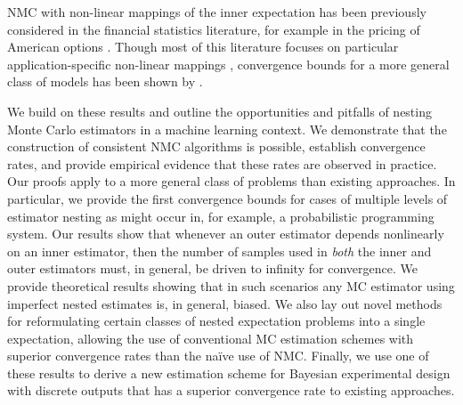 NMC with non-linear mappings of the inner expectation has been previously considered in
the financial statistics literature, for example in the pricing of American
options \citep{longstaff2001valuing}. Though most of this literature focuses on
particular application-specific non-linear mappings \citep{broadie2011efficient,gordy2010nested},
convergence bounds for a more general class of models
has been shown by \citet{hong2009estimating}.

We build on these results and outline the opportunities and pitfalls of nesting Monte Carlo
estimators in a machine learning context.
We demonstrate that the construction of consistent NMC algorithms is possible,
establish convergence rates, and provide
empirical evidence that these rates are observed in practice.
Our proofs apply to a more general class of problems than existing approaches.
In particular, we provide the first convergence bounds for cases of multiple levels of estimator nesting
as might occur in, for example, a probabilistic programming system.
Our results show that whenever an outer estimator depends nonlinearly on an inner
estimator, then the number of samples used in \emph{both} the inner and outer estimators
must, in general, be driven to infinity for convergence.  
We provide theoretical results showing that in such scenarios any MC
estimator using imperfect nested estimates is, in general, biased.
We also lay out novel methods for reformulating certain classes of nested expectation problems
into a single expectation, allowing the use of conventional MC estimation 
schemes with superior convergence rates than the na\"{i}ve use of NMC.  Finally, we use one of these results 
to derive a new estimation scheme for Bayesian experimental design with discrete outputs that has 
a superior convergence rate to existing approaches.



